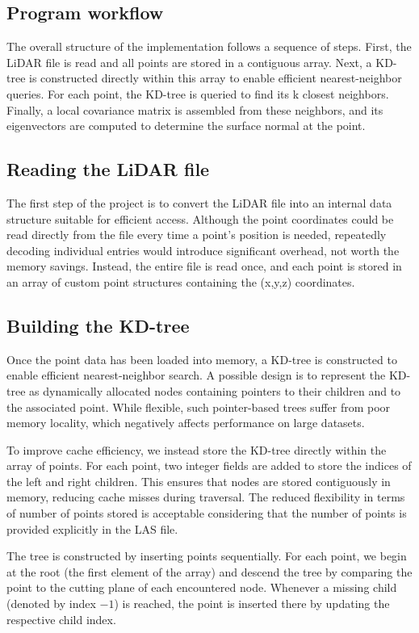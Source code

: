 \documentclass[10pt,a4paper,final]{article}
\begin{document}
\subsection{Program workflow}

The overall structure of the implementation follows a sequence of steps. First, the LiDAR file is read and all points are stored in a contiguous array. Next, a KD-tree is constructed directly within this array to enable efficient nearest-neighbor queries. For each point, the KD-tree is queried to find its k closest neighbors. Finally, a local covariance matrix is assembled from these neighbors, and its eigenvectors are computed to determine the surface normal at the point.

\subsection{Reading the LiDAR file}
The first step of the project is to convert the LiDAR file into an internal data structure suitable for efficient access. Although the point coordinates could be read directly from the file every time a point's position is needed, repeatedly decoding individual entries would introduce significant overhead, not worth the memory savings.
Instead, the entire file is read once, and each point is stored in an array of custom point structures containing the (x,y,z) coordinates.
\subsection{Building the KD-tree}
Once the point data has been loaded into memory, a KD-tree is constructed to enable efficient nearest-neighbor search. A possible design is to represent the KD-tree as dynamically allocated nodes containing pointers to their children and to the associated point. While flexible, such pointer-based trees suffer from poor memory locality, which negatively affects performance on large datasets.

To improve cache efficiency, we instead store the KD-tree directly within the array of points. For each point, two integer fields are added to store the indices of the left and right children. This ensures that nodes are stored contiguously in memory, reducing cache misses during traversal. The reduced flexibility in terms of number of points stored is acceptable considering that the number of points is provided explicitly in the LAS file.  

The tree is constructed by inserting points sequentially. For each point, we begin at the root (the first element of the array) and descend the tree by comparing the point to the cutting plane of each encountered node. Whenever a missing child (denoted by index $-1$) is reached, the point is inserted there by updating the respective child index.
\end{document}
